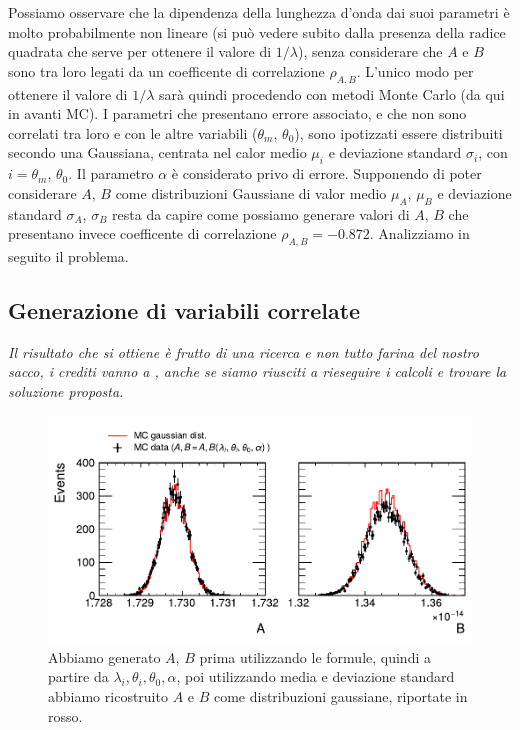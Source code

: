 \documentclass[a4paper,aps,12pt,tightenlines]{revtex4-2}
\begin{document}
Possiamo osservare che la dipendenza della lunghezza d'onda dai suoi parametri è molto probabilmente non lineare (si può vedere subito dalla presenza della radice quadrata che serve per ottenere il valore di $1/\lambda$), senza considerare che $A$ e $B$ sono tra loro legati da un coefficente di correlazione $\rho_{A,B}$. L'unico modo per ottenere il valore di $1/\lambda$ sarà quindi procedendo con metodi Monte Carlo (da qui in avanti MC). I parametri che presentano errore associato, e che non sono correlati tra loro e con le altre variabili ($\theta_m$, $\theta_0$), sono ipotizzati essere distribuiti secondo una Gaussiana, centrata nel calor medio $\mu_i$ e deviazione standard $\sigma_i$, con $i=\theta_m$, $\theta_0$. Il parametro $\alpha$ è considerato privo di errore. Supponendo di poter considerare $A$, $B$ come distribuzioni Gaussiane di valor medio $\mu_A$, $\mu_B$ e deviazione standard $\sigma_A$, $\sigma_B$ resta da capire come possiamo generare valori di $A$, $B$ che presentano invece coefficente di correlazione $\rho_{A,B} = \num{-0.872}$. Analizziamo in seguito il problema.

\subsection{Generazione di variabili correlate}
\emph{Il risultato che si ottiene è frutto di una ricerca e non tutto farina del nostro sacco, i crediti vanno a \cite{anthonyAnswerHowDoes2015, sobolevAnswerHowDoes2015, kaiserSamplePopulationScore1962}, anche se siamo riusciti a rieseguire i calcoli e trovare la soluzione proposta. }

\begin{figure}
\centering
\includegraphics{../figures_and_tests/gaus_compAB.pdf}
\caption{Abbiamo generato $A$, $B$ prima utilizzando le formule, quindi a partire da $\lambda_i, \theta_i, \theta_0, \alpha$, poi utilizzando media e deviazione standard abbiamo ricostruito $A$ e $B$ come distribuzioni gaussiane, riportate in rosso.\label{fig:A_B_gaus}}
\end{figure}
\end{document}
